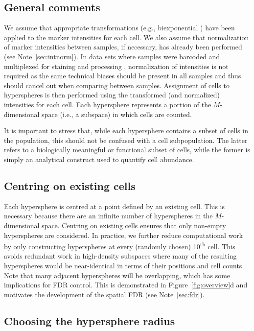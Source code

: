 \documentclass{article}
\begin{document}
\subsection{General comments}
We assume that appropriate transformations (e.g., biexponential \cite{parks2006new}) have been applied to the marker intensities for each cell.
We also assume that normalization of marker intensities between samples, if necessary, has already been performed (see Note~\ref{sec:intnorm}).
In data sets where samples were barcoded and multiplexed for staining and processing \cite{zunder2015palladium}, normalization of intensities is not required as the same technical biases should be present in all samples and thus should cancel out when comparing between samples.
Assignment of cells to hyperspheres is then performed using the transformed (and normalized) intensities for each cell.
Each hypersphere represents a portion of the $M$-dimensional space (i.e., a subspace) in which cells are counted.

It is important to stress that, while each hypersphere contains a subset of cells in the population, this should not be confused with a cell subpopulation.
The latter refers to a biologically meaningful or functional subset of cells, while the former is simply an analytical construct used to quantify cell abundance.

\subsection{Centring on existing cells}
Each hypersphere is centred at a point defined by an existing cell.
This is necessary because there are an infinite number of hyperspheres in the $M$-dimensional space.
Centring on existing cells ensures that only non-empty hyperspheres are considered.
In practice, we further reduce computational work by only constructing hyperspheres at every (randomly chosen) 10\textsuperscript{th} cell.
This avoids redundant work in high-density subspaces where many of the resulting hyperspheres would be near-identical in terms of their positions and cell counts.
Note that many adjacent hyperspheres will be overlapping, which has some implications for FDR control.
This is demonstrated in Figure~\ref{fig:overview}d and motivates the development of the spatial FDR (see Note~\ref{sec:fdr}).

\subsection{Choosing the hypersphere radius}
\end{document}
